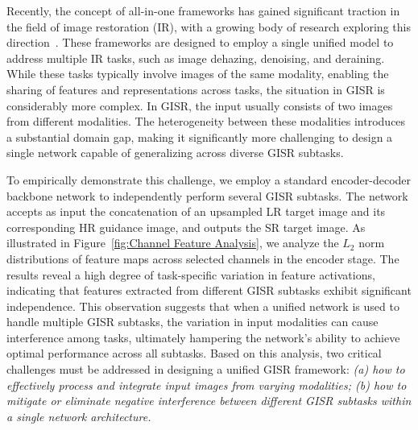 \documentclass[lettersize,journal]{IEEEtran}
\begin{document}
Recently, the concept of all-in-one frameworks has gained significant traction in the field of image restoration (IR), with a growing body of research exploring this direction~\cite{allinone_li2022all,compare_allinone_wang2024gridformer}. These frameworks are designed to employ a single unified model to address multiple IR tasks, such as image dehazing, denoising, and deraining. While these tasks typically involve images of the same modality, enabling the sharing of features and representations across tasks, the situation in GISR is considerably more complex. In GISR, the input usually consists of two images from different modalities. The heterogeneity between these modalities introduces a substantial domain gap, making it significantly more challenging to design a single network capable of generalizing across diverse GISR subtasks.

To empirically demonstrate this challenge, we employ a standard encoder-decoder backbone network to independently perform several GISR subtasks. The network accepts as input the concatenation of an upsampled LR target image and its corresponding HR guidance image, and outputs the SR target image. 
As illustrated in Figure~\ref{fig:Channel Feature Analysis}, we analyze the $L_2$ norm distributions of feature maps across selected channels in the encoder stage. The results reveal a high degree of task-specific variation in feature activations, indicating that features extracted from different GISR subtasks exhibit significant independence. This observation suggests that when a unified network is used to handle multiple GISR subtasks, the variation in input modalities can cause interference among tasks, ultimately hampering the network’s ability to achieve optimal performance across all subtasks.
Based on this analysis, two critical challenges must be addressed in designing a unified GISR framework:\textit{
(a) how to effectively process and integrate input images from varying modalities;
(b) how to mitigate or eliminate negative interference between different GISR subtasks within a single network architecture.}
\end{document}
